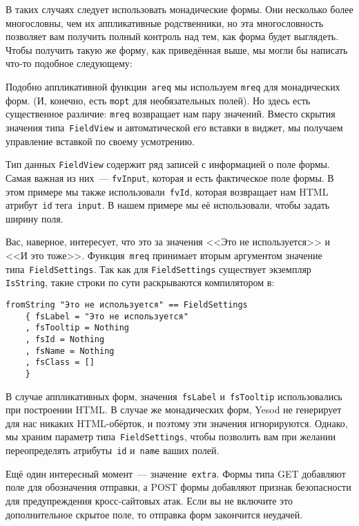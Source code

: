 В таких случаях следует использовать монадические формы. Они несколько более
многословны, чем их аппликативные родственники, но эта многословность
позволяет вам получить полный контроль над тем, как форма будет выглядеть.
Чтобы получить такую же форму, как приведённая выше, мы могли бы написать
что-то подобное следующему:

Подобно аппликативной функции~\lstinline'areq' мы используем \lstinline'mreq'
для монадических форм.  (И, конечно, есть \lstinline'mopt' для необязательных
полей).  Но здесь есть существенное различие: \lstinline'mreq' возвращает нам
пару значений.  Вместо скрытия значения типа~\lstinline'FieldView' и
автоматической его вставки в виджет, мы получаем управление вставкой по своему
усмотрению.

Тип данных \lstinline'FieldView' содержит ряд записей с информацией о поле
формы. Самая важная из них~--- \lstinline'fvInput', которая и есть фактическое
поле формы. В этом примере мы также использовали~\lstinline'fvId', которая
возвращает нам HTML атрибут~\texttt{id} тега~\texttt{input}. В нашем примере
мы её использовали, чтобы задать ширину поля.

Вас, наверное, интересует, что это за значения <<Это не используется>> и <<И это
тоже>>.  Функция~\lstinline'mreq' принимает вторым аргументом значение
типа~\lstinline'FieldSettings'.  Так как для \lstinline'FieldSettings'
существует экземпляр \lstinline'IsString', такие строки по сути раскрываются
компилятором в:

\begin{lstlisting}
fromString "Это не используется" == FieldSettings
    { fsLabel = "Это не используется"
    , fsTooltip = Nothing
    , fsId = Nothing
    , fsName = Nothing
    , fsClass = []
    }
\end{lstlisting}

В случае аппликативных форм, значения~\lstinline'fsLabel'
и~\lstinline'fsTooltip' использовались при построении HTML. В случае же
монадических форм, Yesod не генерирует для нас никаких HTML-обёрток, и поэтому
эти значения игнорируются. Однако, мы храним параметр
типа~\lstinline'FieldSettings', чтобы позволить вам при желании переопределять
атрибуты~\texttt{id} и~\texttt{name} ваших полей.

Ещё один интересный момент~--- значение~\lstinline'extra'. Формы типа GET
добавляют поле для обозначения отправки, а POST формы добавляют признак
безопасности для предупреждения кросс-сайтовых атак.  Если вы не включите это
дополнительное скрытое поле, то отправка форм закончится неудачей.

